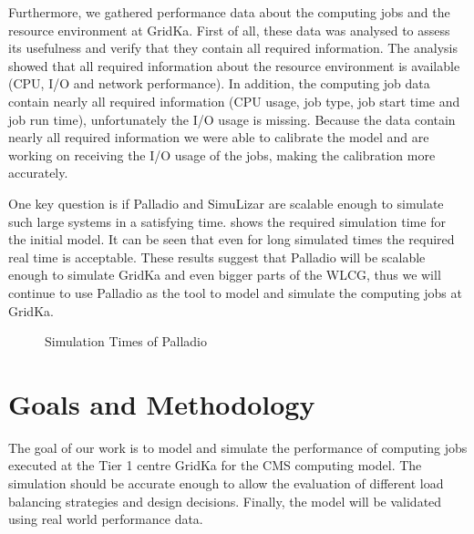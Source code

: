 Furthermore, we gathered performance data about the computing jobs and the resource environment at GridKa.
First of all, these data was analysed to assess its usefulness and verify that they contain all required information. The analysis showed that all required information about the resource environment is available (CPU, I/O and network performance). In addition, the computing job data contain nearly all required information (CPU usage, job type, job start time and job run time), unfortunately the I/O usage is missing.
Because the data contain nearly all required information we were able to calibrate the model and are working on receiving the I/O usage of the jobs, making the calibration more accurately.

One key question is if Palladio and SimuLizar are scalable enough to simulate such large systems in a satisfying time.  shows the required simulation time for the initial model. It can be seen that even for long simulated times the required real time is acceptable.
These results suggest that Palladio will be scalable enough to simulate GridKa and even bigger parts of the WLCG, thus we will continue to use Palladio as the tool to model and simulate the computing jobs at GridKa. 

\begin{figure}[h]
	\begin{center}
		\caption{Simulation Times of Palladio}
		\label{scal}
	\end{center}
\end{figure}


\chapter{Goals and Methodology}
The goal of our work is to model and simulate the performance of computing jobs executed at the Tier 1 centre GridKa for the CMS computing model. The simulation should be accurate enough to allow the evaluation of different load balancing strategies and design decisions. Finally, the model will be validated using real world performance data. 

